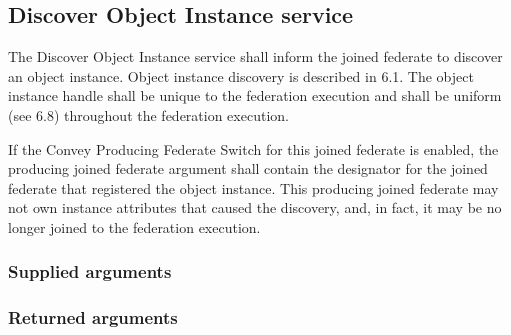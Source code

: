 \begin{compactstdpage}
    \subsection{Discover Object Instance \rtiinitiated{} service}


    The Discover Object Instance \rtiinitiated{} service shall inform the joined federate to discover an object instance. Object instance discovery is described in 6.1. The object instance handle shall be unique to the federation execution and shall be uniform (see 6.8) throughout the federation execution.


    If the Convey Producing Federate Switch for this joined federate is enabled, the producing joined federate argument shall contain the designator for the joined federate that registered the object instance. This producing joined federate may not own instance attributes that caused the discovery, and, in fact, it may be no longer joined to the federation execution.

    \subsubsection{Supplied arguments}



    \subsubsection{Returned arguments}



\end{compactstdpage}

\clearpage

